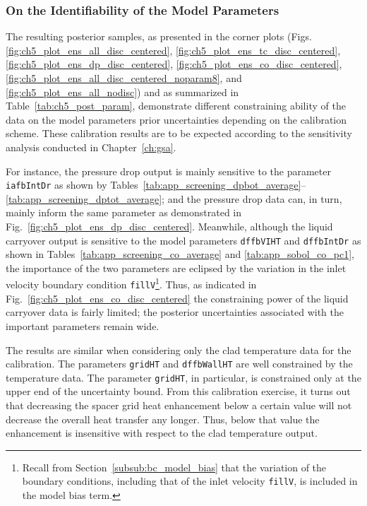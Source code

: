 \subsubsection{On the Identifiability of the Model Parameters}\label{subsub:bc_discussion_identifiability}

The resulting posterior samples, as presented in the corner plots (Figs. \ref{fig:ch5_plot_ens_all_disc_centered}, \ref{fig:ch5_plot_ens_tc_disc_centered}, \ref{fig:ch5_plot_ens_dp_disc_centered}, \ref{fig:ch5_plot_ens_co_disc_centered}, \ref{fig:ch5_plot_ens_all_disc_centered_noparam8}, and \ref{fig:ch5_plot_ens_all_nodisc}) and as summarized in Table~\ref{tab:ch5_post_param}, demonstrate different constraining ability of the data on the model parameters prior uncertainties depending on the calibration scheme.
These calibration results are to be expected according to the sensitivity analysis conducted in Chapter~\ref{ch:gsa}.

For instance, the pressure drop output is mainly sensitive to the parameter \texttt{iafbIntDr} as shown by Tables~\ref{tab:app_screening_dpbot_average}--\ref{tab:app_screening_dptot_average};
and the pressure drop data can, in turn, mainly inform the same parameter as demonstrated in Fig.~\ref{fig:ch5_plot_ens_dp_disc_centered}.
Meanwhile, although the liquid carryover output is sensitive to the model parameters \texttt{dffbVIHT} and \texttt{dffbIntDr} as shown in Tables~\ref{tab:app_screening_co_average} and \ref{tab:app_sobol_co_pc1},
the importance of the two parameters are eclipsed by the variation in the inlet velocity boundary condition \texttt{fillV}\footnote{Recall from Section~\ref{subsub:bc_model_bias} that the variation of the boundary conditions, including that of the inlet velocity \texttt{fillV}, is included in the model bias term.}.
Thus, as indicated in Fig.~\ref{fig:ch5_plot_ens_co_disc_centered} the constraining power of the liquid carryover data is fairly limited; the posterior uncertainties associated with the important parameters remain wide.

The results are similar when considering only the clad temperature data for the calibration.
The parameters \texttt{gridHT} and \texttt{dffbWallHT} are well constrained by the temperature data.
The parameter \texttt{gridHT}, in particular, is constrained only at the upper end of the uncertainty bound.
From this calibration exercise, it turns out that decreasing the spacer grid heat enhancement below a certain value will not decrease the overall heat transfer any longer.
Thus, below that value the enhancement is insensitive with respect to the clad temperature output.

